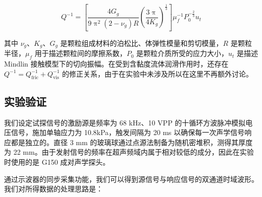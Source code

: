 \begin{equation}
  Q^{-1} = \left[\frac{4G_{g}}{9\uppi^2(2-\nu_{g})R}\left(\frac{3\uppi}{4K_{g}}\right)^{\frac{1}{3}}\right]\mu_{f}^{-1}P_{0}^{-\frac{2}{3}}u_{t}
\end{equation}

其中 $\nu_{g}$、$K_{g}$、$G_{g}$ 是颗粒组成材料的泊松比、体弹性模量和剪切模量，$R$ 是颗粒半径，$\mu_{f}$ 用于描述颗粒间的摩擦系数，$P_{0}$ 是颗粒介质所受的应力大小，$u_{t}$ 是描述 Mindlin 接触模型下的切向振幅。在受到含黏度流体润滑作用时，还存在 $Q^{-1} = Q_{\text{fric}}^{-1} + Q_{\text{vis}}^{-1}$ 的修正关系，由于在实验中未涉及所以在这里不再额外讨论。


\subsection{实验验证}

我们设定试探信号的激励源是频率为 68 \unit{\kilo\hertz}、10 \unit{VPP} 的十循环方波脉冲模拟电压信号，施加单轴应力为 10.8\unit{\kilo\pascal}，触发间隔为 20 \unit{\milli\second} 以确保每一次声学信号响应都是独立的。直径 3 \unit{\milli\meter} 的玻璃球通过点源法制备为随机密堆积，测得其厚度为 22 \unit{\milli\meter}。由于发射信号的频率在超声频域内属于相对较低的成分，因此在实验时使用的是 G150 成对声学探头。

通过示波器的同步采集功能，我们可以得到源信号与响应信号的双通道时域波形。我们对所得数据的处理思路是：

